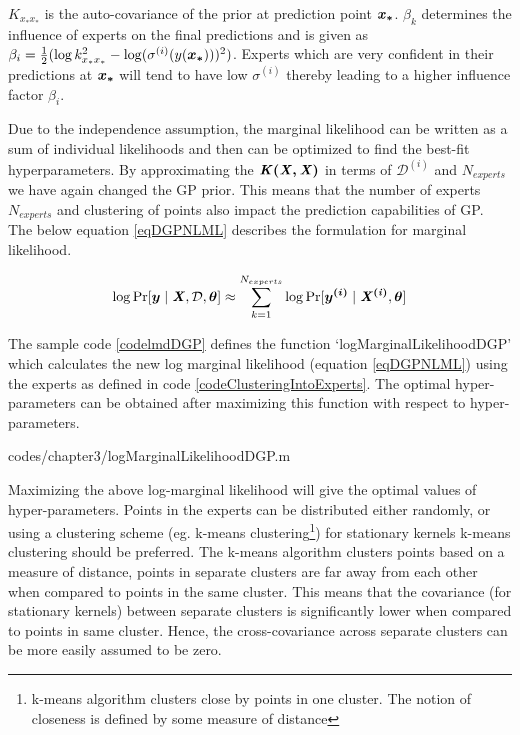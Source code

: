 $K_{x_{*}x_{*}}$ is the auto-covariance of the prior at prediction point $\boldsymbol{x_{*}}$. $\beta_{k}$ determines the influence of experts on the final predictions \cite{DBLP:journals/corr/CaoF14
} and is given as $\beta_{i} = \frac{1}{2}(\log k_{x_{*}x_{*}}^{2} - \log(\sigma^{(i)}(y(\boldsymbol{x_{*}})))^{2})$. Experts which are very confident in their predictions at $\boldsymbol{x_{*}}$ will tend to have low $\sigma^{(i)}$ thereby leading to a higher influence factor $\beta_{i}$.

Due to the independence assumption, the marginal likelihood can be written as a sum of individual likelihoods and then can be optimized to find the best-fit hyperparameters. By approximating the $\bm{\mathit{K(X, X)}}$ in terms of $\mathcal{D}^{(i)}$ and $N_{experts}$ we have again changed the GP prior. This means that the number of experts $N_{experts}$ and clustering of points also impact the prediction capabilities of GP. The below equation \ref{eqDGPNLML} describes the formulation for marginal likelihood. 

\begin{align}\label{eqDGPNLML}
    \log \Pr[\boldsymbol{y} \mid \bm{\mathit{X}}, \mathcal{D}, \boldsymbol{\theta}] \approx \sum_{k=1}^{N_{experts}} \log \Pr[\boldsymbol{y^{(i)}}\mid \bm{\mathit{X^{(i)}}}, \boldsymbol{\theta}]
 \end{align}

The sample code \ref{codelmdDGP} defines the function `logMarginalLikelihoodDGP' which calculates the new log marginal likelihood (equation \ref{eqDGPNLML}) using the experts as defined in code \ref{codeClusteringIntoExperts}. The optimal hyper-parameters can be obtained after maximizing this function with respect to hyper-parameters. 

\begin{mdframed}[hidealllines=true,backgroundcolor=lightgray!20]

                    {codes/chapter3/logMarginalLikelihoodDGP.m}
\end{mdframed}

Maximizing the above log-marginal likelihood will give the optimal values of hyper-parameters. Points in the experts can be distributed either randomly, or using a clustering scheme (eg. k-means clustering\footnote{k-means algorithm clusters close by points in one cluster. The notion of closeness is defined by some measure of distance}) for stationary kernels k-means clustering should be preferred. The k-means algorithm clusters points based on a measure of distance, points in separate clusters are far away from each other when compared to points in the same cluster. This means that the covariance (for stationary kernels) between separate clusters is significantly lower when compared to points in same cluster. Hence, the cross-covariance across separate clusters can be more easily assumed to be zero.

